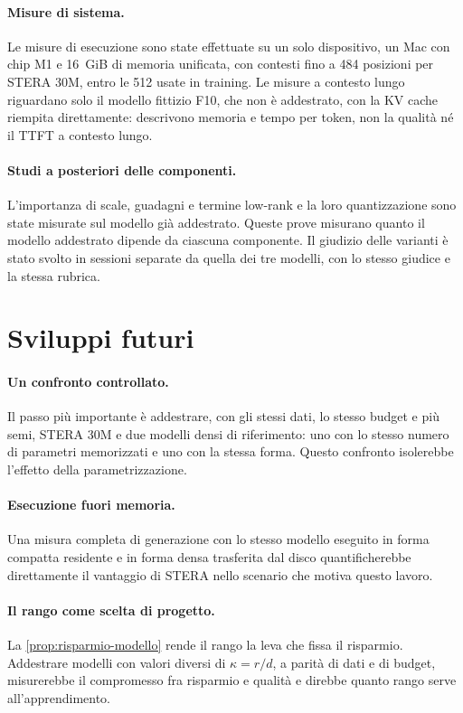 \paragraph{Misure di sistema.} Le misure di esecuzione sono state effettuate su un solo dispositivo, un Mac con chip M1 e 16~GiB di memoria unificata, con contesti fino a 484 posizioni per STERA 30M, entro le 512 usate in training. Le misure a contesto lungo riguardano solo il modello fittizio F10, che non è addestrato, con la KV cache riempita direttamente: descrivono memoria e tempo per token, non la qualità né il TTFT a contesto lungo.

\paragraph{Studi a posteriori delle componenti.} L'importanza di scale, guadagni e termine low-rank e la loro quantizzazione sono state misurate sul modello già addestrato. Queste prove misurano quanto il modello addestrato dipende da ciascuna componente. Il giudizio delle varianti è stato svolto in sessioni separate da quella dei tre modelli, con lo stesso giudice e la stessa rubrica.

\section{Sviluppi futuri}

\paragraph{Un confronto controllato.} Il passo più importante è addestrare, con gli stessi dati, lo stesso budget e più semi, STERA 30M e due modelli densi di riferimento: uno con lo stesso numero di parametri memorizzati e uno con la stessa forma. Questo confronto isolerebbe l'effetto della parametrizzazione.

\paragraph{Esecuzione fuori memoria.} Una misura completa di generazione con lo stesso modello eseguito in forma compatta residente e in forma densa trasferita dal disco quantificherebbe direttamente il vantaggio di STERA nello scenario che motiva questo lavoro.

\paragraph{Il rango come scelta di progetto.} La \autoref{prop:risparmio-modello} rende il rango la leva che fissa il risparmio. Addestrare modelli con valori diversi di $\kappa=r/d$, a parità di dati e di budget, misurerebbe il compromesso fra risparmio e qualità e direbbe quanto rango serve all'apprendimento.

